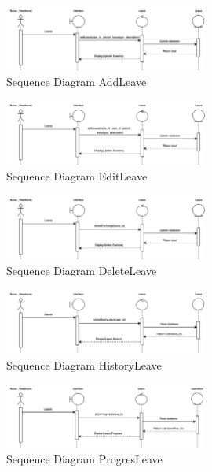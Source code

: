 \begin{figure}[h]
    \centering
    \includegraphics[width=0.6\textwidth]{Sequence 7.1.png}
    \caption{Sequence Diagram AddLeave}
    \end{figure}

    \begin{figure}[h]
    \centering
    \includegraphics[width=0.6\textwidth]{Sequence 7.2.png}
    \caption{Sequence Diagram EditLeave}
    \end{figure}

    \begin{figure}[h]
    \centering
    \includegraphics[width=0.6\textwidth]{Sequence 7.3.png}
    \caption{Sequence Diagram DeleteLeave}
    \end{figure}

    \begin{figure}[h]
    \centering
    \includegraphics[width=0.6\textwidth]{Sequence 7.4.png}
    \caption{Sequence Diagram HistoryLeave}
    \end{figure}

    \begin{figure}[h]
    \centering
    \includegraphics[width=0.6\textwidth]{Sequence 7.5.png}
    \caption{Sequence Diagram ProgresLeave}
    \end{figure}

